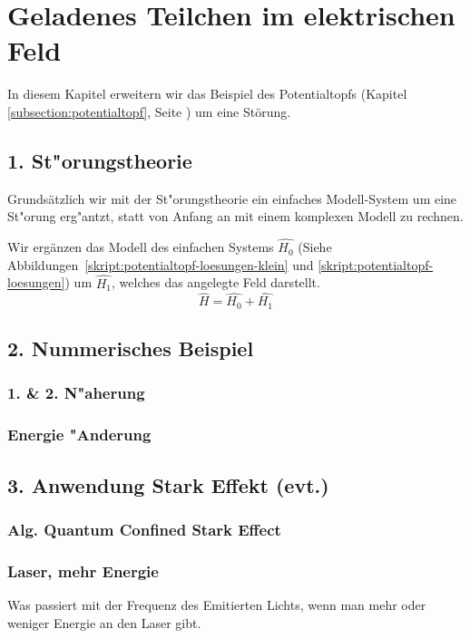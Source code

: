 \chapter{Geladenes Teilchen im elektrischen Feld\label{chapter:efeld}}
\begin{refsection}


In diesem Kapitel erweitern wir das Beispiel des Potentialtopfs 
(Kapitel \ref{subsection:potentialtopf}, Seite \pageref{subsection:potentialtopf})
um eine Störung.

\section{ 1. St"orungstheorie }
Grundsätzlich wir mit der St"orungstheorie ein einfaches Modell-System um eine St"orung
erg"antzt, statt von Anfang an mit einem komplexen Modell zu rechnen.

Wir erg\"anzen das Modell des einfachen Systems $\hat{H_0}$
(Siehe Abbildungen~\ref{skript:potentialtopf-loesungen-klein}
und \ref{skript:potentialtopf-loesungen})
um $\hat{H_1}$, welches das angelegte Feld darstellt.
\[
\hat{H} = \hat{H_0} + \hat{H_1}
\]



\section{ 2. Nummerisches Beispiel }

\subsection{ 1. \& 2. N"aherung }

\subsection{ Energie "Anderung }

\section{ 3. Anwendung Stark Effekt (evt.) }

\subsection{ Alg. Quantum Confined Stark Effect }

\subsection{ Laser, mehr Energie }
Was passiert mit der Frequenz des Emitierten Lichts, wenn man mehr oder weniger Energie an den Laser gibt.

\printbibliography[heading=subbibliography]
\end{refsection}
